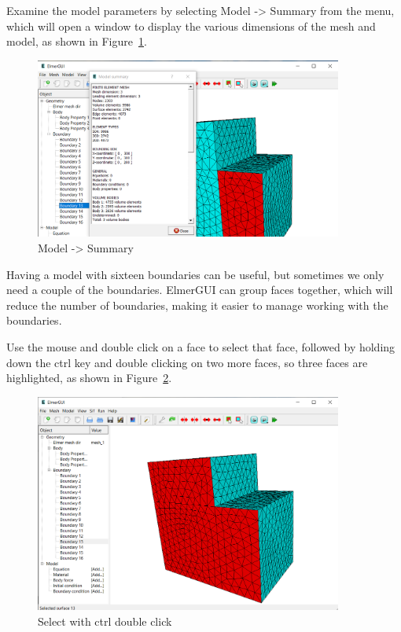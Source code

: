 Examine the model parameters by selecting Model -> Summary from the menu, which will open a window to display the various dimensions of the mesh and model, as shown in Figure~\ref{fg:elmergui-3}.

\begin{figure}[H]
\centering
\includegraphics[width=0.9\textwidth]{elmergui-3}
\caption{Model -> Summary}\label{fg:elmergui-3}
\end{figure}

Having a model with sixteen boundaries can be useful, but sometimes we only need a couple of the boundaries.  ElmerGUI can group faces together, which will reduce the number of boundaries, making it easier to manage working with the boundaries.\\

\newpage

Use the mouse and double click on a face to select that face, followed by holding down the ctrl key and double clicking on two more faces, so three faces are highlighted, as shown in Figure~\ref{fg:elmergui-4}.

\begin{figure}[H]
\centering
\includegraphics[width=0.9\textwidth]{elmergui-4}
\caption{Select with ctrl double click}\label{fg:elmergui-4}
\end{figure}

